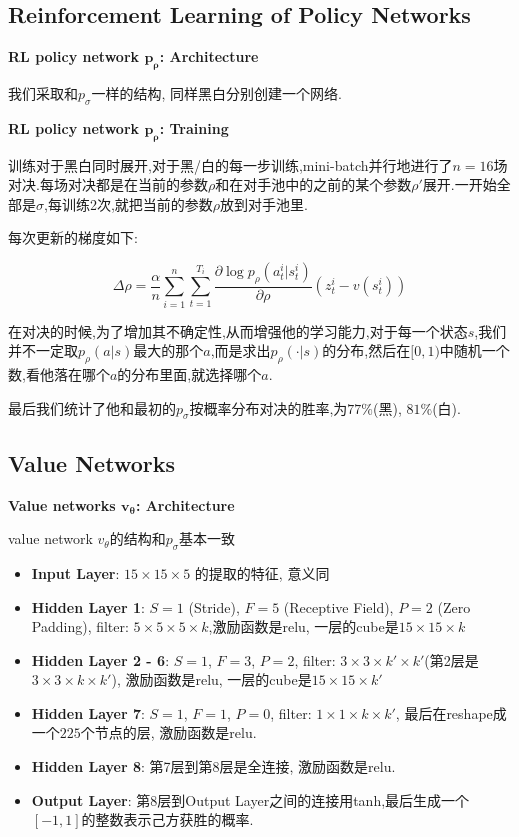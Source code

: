 \documentclass[twocolumn]{article}
\begin{document}
\subsection{Reinforcement Learning of Policy Networks}

\noindent \textbf{RL policy network $\bm{p_\rho}$: Architecture}

我们采取和$p_\sigma$一样的结构, 同样黑白分别创建一个网络.

\noindent \textbf{RL policy network $\bm{p_\rho}$: Training}

训练对于黑白同时展开,对于黑/白的每一步训练,mini-batch并行地进行了$n=16$场对决.每场对决都是在当前的参数$\rho$和在对手池中的之前的某个参数$\rho'$展开.一开始全部是$\sigma$,每训练2次,就把当前的参数$\rho$放到对手池里.

每次更新的梯度如下:

\[
\Delta\rho = \frac{\alpha}{n} \sum_{i=1}^n\sum_{t=1}^{T_i} \frac{\partial\log p_\rho(a_t^i|s_t^i)}{\partial \rho}(z_t^i-v(s_t^i))
\]

在对决的时候,为了增加其不确定性,从而增强他的学习能力,对于每一个状态$s$,我们并不一定取$p_\rho(a|s)$最大的那个$a$,而是求出$p_\rho(\cdot|s)$的分布,然后在$[0,1)$中随机一个数,看他落在哪个$a$的分布里面,就选择哪个$a$.

最后我们统计了他和最初的$p_\sigma$按概率分布对决的胜率,为$77\%$(黑), $81\%$(白).

\subsection{Value Networks}

\noindent \textbf{Value networks $\bm{v_\theta}$: Architecture}

value network $v_\theta$的结构和$p_\sigma$基本一致

\begin{itemize}
	\item \textbf{Input Layer}: $15 \times 15 \times 5$ 的提取的特征, 意义同
	\item \textbf{Hidden Layer 1}: $S = 1$ (Stride), $F = 5$ (Receptive Field), $P = 2$ (Zero Padding), filter: $5 \times 5 \times 5 \times k$,激励函数是relu, 一层的cube是$15 \times 15 \times k$
	\item \textbf{Hidden Layer 2 - 6}: $S = 1$, $F = 3$, $P = 2$, filter: $3 \times 3 \times k' \times k'$(第2层是$3 \times 3 \times k \times k'$), 激励函数是relu, 一层的cube是$15 \times 15 \times k'$
	\item \textbf{Hidden Layer 7}: $S = 1$, $F = 1$, $P = 0$, filter: $1 \times 1 \times k \times k'$, 最后在reshape成一个$225$个节点的层, 激励函数是relu. 
	\item \textbf{Hidden Layer 8}: 第7层到第8层是全连接, 激励函数是relu.
	\item \textbf{Output Layer}: 第8层到Output Layer之间的连接用tanh,最后生成一个$[-1,1]$的整数表示己方获胜的概率.
\end{itemize}
\end{document}

